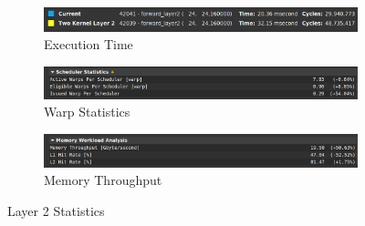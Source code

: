 \documentclass{article}
\begin{document}
\begin{figure}[H]
    \centering
    \begin{subfigure}[b]{\linewidth}
        \includegraphics[width=\linewidth]{ms4_layer2_runtime}
        \caption{Execution Time}
    \end{subfigure}
    \begin{subfigure}[b]{\linewidth}
        \includegraphics[width=\linewidth]{ms4_layer2_warp}
        \caption{Warp Statistics}
    \end{subfigure}
    \begin{subfigure}[b]{\linewidth}
        \includegraphics[width=\linewidth]{ms4_layer2_mem}
        \caption{Memory Throughput}
    \end{subfigure}
    \caption{Layer 2 Statistics}
\end{figure}
\end{document}
